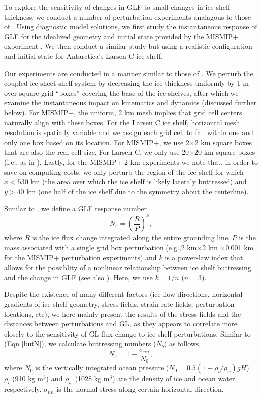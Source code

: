 \documentclass[review,oneside]{igs}
\begin{document}
To explore the sensitivity of changes in GLF to small changes in ice shelf thickness, we conduct a number of perturbation experiments analagous to those of \citet{reese2018}. Using diagnostic model solutions, we first study the instantaneous response of GLF for the idealized geometry and initial state provided by the MISMIP+ experiment \citep{asay2016}. We then conduct a similar study but using a realistic configuration and initial state for Antarctica's Larsen C ice shelf. %

Our experiments are conducted in a manner similar to those of \cite{reese2018}. We perturb the coupled ice sheet-shelf system by decreasing the ice thickness uniformly by 1 m over square grid ``boxes'' covering the base of the ice shelves, after which we examine the instantaneous impact on kinematics and dynamics (discussed further below). For MISMIP+, the uniform, 2 km mesh implies that grid cell centers naturally align with these boxes. For the Larsen C ice shelf, horizontal mesh resolution is spatially variable and we assign each grid cell to fall within one and only one box based on its location. For MISMIP+, we use 2$\times$2 km square boxes that are also the real cell size. For Larsen C, we only use 20$\times$20 km square boxes (i.e., as in \citet{reese2018}). Lastly, for the MISMIP+ 2 km experiments we note that, in order to save on computing costs, we only perturb the region of the ice shelf for which $x<530$ km (the area over which the ice shelf is likely lateraly buttressed) and $y>40$ km (one half of the ice shelf due to the symmetry about the centerline).

Similar to \cite{reese2018}, we define a GLF response number
\begin{equation}
N_r = \left(\frac{R}{P}\right)^k,
\end{equation}
where $R$ is the ice flux change integrated along the entire grounding line, $P$ is the mass associated with a single grid box perturbation (e.g.,2 km$\times$2 km $\times$0.001 km for the MISMIP+ perturbation experiments) and $k$ is a power-law index that allows for the possiblity of a nonlinear relationship between ice shelf buttressing and the change in GLF (see also \cite{schoof2007}). Here, we use $k=1/n$ ($n=3$).

Despite the existence of many different factors (ice flow directions, horizontal gradients of ice shelf geometry, stress fields, strain-rate fields, perturbation locations, etc), we here mainly present the results of the stress fields and the distances between perturbations and GL, as they appears to correlate more closely to the sensitivity of GL flux change to ice shelf perturbations. Similar to  \cite{furst2016} (Eqn \ref{butN}), we calculate buttressing numbers ($N_b$) as follows,
\begin{equation}
N_b=1-\frac{\sigma_{nn}}{N_0},
\label{butN}
\end{equation}
where $N_0$ is the vertically integrated ocean pressure ($N_0=0.5\left(1-{\rho_i}/{\rho_w}\right)gH$). $\rho_i$ (910 kg m$^3$) and $\rho_w$ (1028 kg m$^3$) are the density of ice and ocean water, respectively. $\sigma_{nn}$ is the normal stress along certain horizontal direction.
\end{document}
